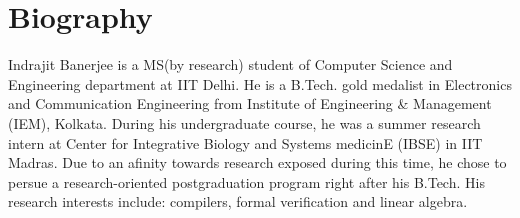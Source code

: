 
\chapter*{Biography}

Indrajit Banerjee is a MS(by research) student of Computer Science and Engineering department at IIT Delhi.
He is a B.Tech. gold medalist in Electronics and Communication Engineering from Institute of Engineering \&
Management (IEM), Kolkata.
During his undergraduate course, he was a summer research intern at
Center for Integrative Biology and Systems medicinE (IBSE) in IIT Madras.
Due to an afinity towards research exposed during this time, he chose to persue
a research-oriented postgraduation program right after his B.Tech.
His research interests include: compilers, formal verification and linear algebra.

